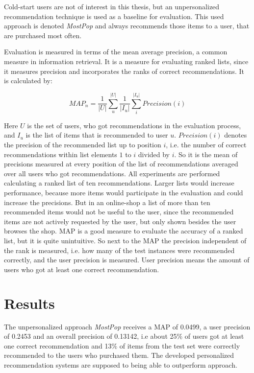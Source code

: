 \documentclass[10pt]{reportMaster}
\begin{document}
Cold-start users are not of interest in this thesis, but an unpersonalized recommendation technique is used as a baseline for evaluation.
This used approach is denoted \textit{MostPop} and always recommends those items to a user, that are purchased most often.

Evaluation is measured in terms of the mean average precision, a common measure in information retrieval.
It is a measure for evaluating ranked lists, since it measures precision and incorporates the ranks of correct recommendations.
It is calculated by:

\begin{equation}
	MAP_n = \frac{1}{|U|} \sum_u^{|U|} \frac{1}{|I_u|}\sum_i^{|I_u|} Precision(i)
\end{equation}

Here $U$ is the set of users, who got recommendations in the evaluation process, and $I_u$ is the list of items that is recommended to user $u$.
$Precision(i)$ denotes the precision of the recommended list up to position $i$, i.e. the number of correct recommendations within list elements $1$ to $i$ divided by $i$.
So it is the mean of precisions measured at every position of the list of recommendations averaged over all users who got recommendations.
All experiments are performed calculating a ranked list of ten recommendations.
Larger lists would increase performance, because more items would participate in the evaluation and could increase the precisions. %
But in an online-shop a list of more than ten recommended items would not be useful to the user, since the recommended items are not actively requested by the user, but only shown besides the user browses the shop.
MAP is a good measure to evaluate the accuracy of a ranked list, but it is quite unintuitive.
So next to the MAP the precision independent of the rank is measured, i.e. how many of the test instances were recommended correctly, and the user precision is measured.
User precision means the amount of users who got at least one correct recommendation.


\section{Results}
\label{sec:results}
The unpersonalized approach \textit{MostPop} receives a MAP of 0.0499, a user precision of 0.2453 and an overall precision of 0.13142, i.e about 25\% of users got at least one correct recommendation and 13\% of items from the test set were correctly recommended to the users who purchased them.
The developed personalized recommendation systems are supposed to being able to outperform approach.
\end{document}
